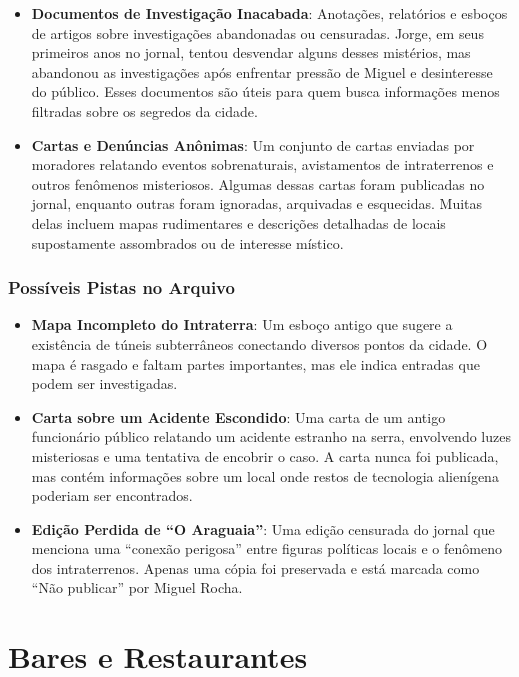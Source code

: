 \begin{itemize}
    \item \textbf{Documentos de Investigação Inacabada}: Anotações, relatórios e esboços de artigos sobre investigações abandonadas ou censuradas. Jorge, em seus primeiros anos no jornal, tentou desvendar alguns desses mistérios, mas abandonou as investigações após enfrentar pressão de Miguel e desinteresse do público. Esses documentos são úteis para quem busca informações menos filtradas sobre os segredos da cidade.
    
    \item \textbf{Cartas e Denúncias Anônimas}: Um conjunto de cartas enviadas por moradores relatando eventos sobrenaturais, avistamentos de intraterrenos e outros fenômenos misteriosos. Algumas dessas cartas foram publicadas no jornal, enquanto outras foram ignoradas, arquivadas e esquecidas. Muitas delas incluem mapas rudimentares e descrições detalhadas de locais supostamente assombrados ou de interesse místico.
\end{itemize}

\subsubsection{Possíveis Pistas no Arquivo}

\begin{itemize}
    \item \textbf{Mapa Incompleto do Intraterra}: Um esboço antigo que sugere a existência de túneis subterrâneos conectando diversos pontos da cidade. O mapa é rasgado e faltam partes importantes, mas ele indica entradas que podem ser investigadas.
    
    \item \textbf{Carta sobre um Acidente Escondido}: Uma carta de um antigo funcionário público relatando um acidente estranho na serra, envolvendo luzes misteriosas e uma tentativa de encobrir o caso. A carta nunca foi publicada, mas contém informações sobre um local onde restos de tecnologia alienígena poderiam ser encontrados.
    
    \item \textbf{Edição Perdida de ``O Araguaia''}: Uma edição censurada do jornal que menciona uma “conexão perigosa” entre figuras políticas locais e o fenômeno dos intraterrenos. Apenas uma cópia foi preservada e está marcada como “Não publicar” por Miguel Rocha.
\end{itemize}

\section{Bares e Restaurantes}

